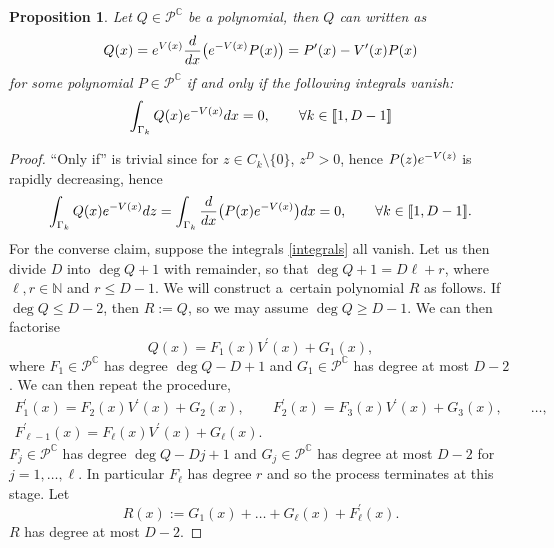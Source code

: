 \documentclass[11pt]{article}
\numberwithin{equation}{section}
\numberwithin{equation}{section}
\newtheorem{Proposition}[Theorem]{Proposition}
\begin{document}
\begin{Proposition}\label{representation} Let $Q \in \mathscr{P}^\mathbb{C}$ be a polynomial, then $Q$ can written as
\begin{equation*}
Q(x) = {\rm e}^{V(x)} \frac{\rm d}{{\rm d}x}\big({\rm e}^{-V(x)} P(x) \big) = P^\prime(x) - V^\prime(x) P(x)
\end{equation*}
for some polynomial $P \in \mathscr{P}^\mathbb{C}$ if and only if the following integrals vanish:
\begin{align}\label{integrals}
\int_{\Gamma_k} Q(x){\rm e}^{-V(x)} {\rm d}x = 0,\qquad \forall k \in [\![ 1,D-1]\!]
\end{align}
\end{Proposition}
\begin{proof}
\enquote{Only if} is trivial since for $z \in C_k \setminus \{ 0 \}$, $z^{D} > 0$, hence $P(z){\rm e}^{-V(z)}$ is rapidly decreasing, hence
\begin{align*}
\int_{\Gamma_k} Q(x){\rm e}^{-V(x)} {\rm d}z = \int_{\Gamma_k} \frac{\rm d}{{\rm d}x}\big(P(x){\rm e}^{-V(x)}\big) {\rm d}x =0,\qquad \forall k \in [\![ 1,D-1]\!].
\end{align*}
For the converse claim, suppose the integrals \eqref{integrals} all vanish. Let us then divide $D$ into ${\deg Q+1}$ with remainder, so that $\deg Q+1 = D \ell + r$, where $\ell , r \in \mathbb{N}$ and $r \leq D-1$. We will construct a~certain polynomial $R$ as follows. If $\deg Q \leq D-2$, then $R:=Q$, so we may assume ${\deg Q \geq D-1}$. We can then factorise
\begin{equation*}
Q(x) = F_1 (x) V^\prime(x) + G_1(x),
\end{equation*}
where $F_1 \in \mathscr{P}^\mathbb{C}$ has degree $\deg Q - D+1$ and $G_1 \in \mathscr{P}^\mathbb{C}$ has degree at most $D-2$. We can then repeat the procedure,
\begin{gather*}
F_1^\prime(x) = F_2(x) V^\prime(x) + G_2(x), \qquad
F_2^\prime(x)= F_3(x) V^\prime(x) + G_3(x),\qquad \ldots, \\
F_{\ell-1}^\prime(x) = F_{\ell}(x) V^\prime(x) + G_{\ell}(x).
\end{gather*}
$F_j \in \mathscr{P}^\mathbb{C}$ has degree $\deg Q-Dj+1$ and $G_j \in \mathscr{P}^\mathbb{C}$ has degree at most $D-2$ for $j=1, \dots , \ell$. In particular $F_\ell$ has degree $r$ and so the process terminates at this stage. Let
\begin{equation*}
R(x) := G_1(x) + \dots + G_\ell(x) + F_\ell^\prime(x).
\end{equation*}
$R$ has degree at most $D-2$.


\end{proof}
\end{document}
